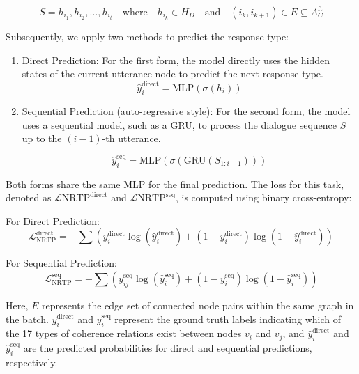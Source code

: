 \begin{itemize}
    \begin{equation}
    S = { h_{i_1}, h_{i_2}, \ldots, h_{i_t} } \quad \text{where} \quad h_{i_k} \in H_{D} \quad \text{and} \quad (i_k, i_{k+1}) \in E \subseteq A_{C}^{\text{ft}}
    \end{equation}
    
    Subsequently, we apply two methods to predict the response type:

    \begin{enumerate}
        \item Direct Prediction: For the first form, the model directly uses the hidden states of the current utterance node to predict the next response type.
        \begin{equation}
            \hat{y}_{i}^{\text{direct}} = \text{MLP}(\sigma(h_{i}))
        \end{equation}

        \item Sequential Prediction (auto-regressive style): For the second form, the model uses a sequential model, such as a GRU, to process the dialogue sequence \( S \) up to the \( (i-1) \)-th utterance.

        \begin{equation}
            \hat{y}_{i}^{\text{seq}} = \text{MLP}(\sigma(\text{GRU}(S_{1:i-1})))
        \end{equation}

        \end{enumerate}

    Both forms share the same MLP for the final prediction. The loss for this task, denoted as $\mathcal{L}{\text{NRTP}}^{\text{direct}}$ and $\mathcal{L}{\text{NRTP}}^{\text{seq}}$, is computed using binary cross-entropy:

    For Direct Prediction:
    \begin{equation}
    \mathcal{L}_{\text{NRTP}}^{\text{direct}} = -\sum \left( y_{i}^{\text{direct}} \log(\hat{y}_{i}^{\text{direct}}) + (1 - y_{i}^{\text{direct}}) \log(1 - \hat{y}_{i}^{\text{direct}}) \right)
    \end{equation}

    For Sequential Prediction:
    \begin{equation}
    \mathcal{L}_{\text{NRTP}}^{\text{seq}} = -\sum \left( y_{ij}^{\text{seq}} \log(\hat{y}_{i}^{\text{seq}}) + (1 - y_{i}^{\text{seq}}) \log(1 - \hat{y}_{i}^{\text{seq}}) \right)
    \end{equation}

    Here, $E$ represents the edge set of connected node pairs within the same graph in the batch. $y_{i}^{\text{direct}}$ and $y_{i}^{\text{seq}}$ represent the ground truth labels indicating which of the 17 types of coherence relations exist between nodes $v_i$ and $v_j$, and $\hat{y}_{i}^{\text{direct}}$ and $\hat{y}_{i}^{\text{seq}}$ are the predicted probabilities for direct and sequential predictions, respectively.


\end{itemize}

